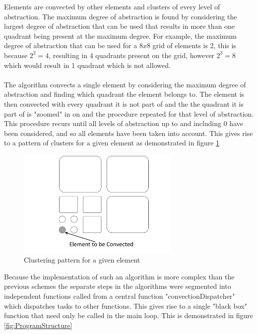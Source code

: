 Elements are convected by other elements and clusters of every level of abstraction. The maximum degree of abstraction is found by considering the largest degree of abstraction that can be used that results in more than one quadrant being present at the maximum degree. For example, the maximum degree of abstraction that can be used for a $8x8$ grid of elements is 2, this is because $2^2=4$, resulting in 4 quadrants present on the grid, however $2^3=8$ which would result in 1 quadrant which is not allowed.
\\\\
The algorithm convects a single element by considering the maximum degree of abstraction and finding which quadrant the element belongs to. The element is then convected with every quadrant it is not part of and the the quadrant it is part of is "zoomed" in on and the procedure repeated for that level of abstraction. This procedure recurs until all levels of abstraction up to and including 0 have been considered, and so all elements have been taken into account. This gives rise to a pattern of clusters for a given element as demonstrated in figure \ref{fig:AbstractionExample}

\begin{figure}[H]
\centering
\includegraphics[width=0.7\textwidth]{Figures/DynamicAbstractionExample.png}
\caption{\label{fig:AbstractionExample} Clustering pattern for a given element}
\end{figure} 

Because the implementation of such an algorithm is more complex than the previous schemes the separate steps in the algorithms were segmented into independent functions called from a central function "convectionDispatcher" which dispatches tasks to other functions. This gives rise to a single "black box" function that need only be called in the main loop. This is demonstrated in figure \ref{fig:ProgramStructure}

